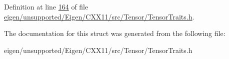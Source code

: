 Definition at line \hyperlink{eigen_2unsupported_2_eigen_2_c_x_x11_2src_2_tensor_2_tensor_traits_8h_source_l00164}{164} of file \hyperlink{eigen_2unsupported_2_eigen_2_c_x_x11_2src_2_tensor_2_tensor_traits_8h_source}{eigen/unsupported/\+Eigen/\+C\+X\+X11/src/\+Tensor/\+Tensor\+Traits.\+h}.



The documentation for this struct was generated from the following file\+:\begin{DoxyCompactItemize}
\item 
eigen/unsupported/\+Eigen/\+C\+X\+X11/src/\+Tensor/\+Tensor\+Traits.\+h\end{DoxyCompactItemize}
